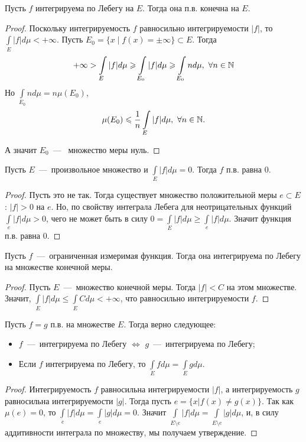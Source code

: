 \begin{proposition}
    Пусть $f$ интегрируема по Лебегу на $E$. Тогда она п.в. конечна на $E$.
\end{proposition}
\begin{proof}
    Поскольку интегрируемость $f$ равносильно интегрируемости $|f|$, то $\int\limits_E |f|d\mu < +\infty$. Пусть $E_0 = \{x \mid f(x) = \pm\infty\} \subset E$. Тогда \[+\infty > \int\limits_{E} |f|d\mu \geqslant \int\limits_{E_0}|f|d\mu \geqslant \int\limits_{E_0} nd\mu, \ \forall n \in \mathbb{N}\]
    Но $\int\limits_{E_0} nd\mu = n\mu(E_0)$,
    \[
    \mu(E_0) \leqslant \frac{1}{n} \int\limits_{E} |f|d\mu, \ \forall n \in \mathbb{N}.
    \]
    
    А значит $E_0$~---~ множество меры нуль.
\end{proof}

\begin{proposition}
    Пусть $E$~---~произвольное множество и $\int\limits_E |f|d\mu = 0$. Тогда $f$ п.в. равна $0$.
\end{proposition}
\begin{proof}
    Пусть это не так. Тогда существует множество положительной меры $e \subset E$: $|f| > 0$ на $e$. Но, по свойству интеграла Лебега для неотрицательных функций $\int\limits_e |f| d\mu > 0$, чего не может быть в силу $0 = \int\limits_E |f| d\mu \geq \int\limits_e |f|d\mu$. Значит функция п.в. равна $0$.
\end{proof}

\begin{proposition}
    Пусть $f$~---~ограниченная измеримая функция. Тогда она интегрируема по Лебегу на множестве конечной меры.
\end{proposition}
\begin{proof}
    Пусть $E$~---~множество конечной меры. Тогда $|f| < C$ на этом множестве. Значит, $\int\limits_E |f|d\mu \leq \int\limits_E Cd\mu < +\infty$, что равносильно интегрируемости $f$.
\end{proof}

\begin{proposition}
    Пусть $f = g$ п.в. на множестве $E$. Тогда верно следующее:
    \begin{itemize}
        \item $f$~---~интегрируема по Лебегу $\Longleftrightarrow$ $g$~---~интегрируема по Лебегу;
        \item Если $f$ интегрируема по Лебегу, то $\int\limits_E fd\mu = \int\limits_E gd\mu$.
    \end{itemize}
\end{proposition}
\begin{proof}
    Интегрируемость $f$ равносильна интегрируемости $|f|$, а интегрируемость $g$ равносильна интегрируемости $|g|$. Тогда пусть $e = \{x | f(x) \neq g(x)\}$. Так как $\mu(e) = 0$, то $\int\limits_e |f| d\mu = \int\limits_e |g|d\mu = 0$. Значит $\int\limits_{E\setminus e} |f|d\mu = \int\limits_{E\setminus e} |g|d\mu$, и, в силу аддитивности интеграла по множеству, мы получаем утверждение.
\end{proof}

